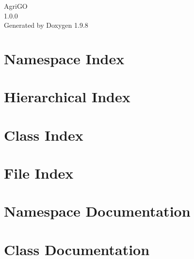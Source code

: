 \documentclass[twoside]{book}
\newcommand{\+}{\discretionary{\mbox{\scriptsize$\hookleftarrow$}}{}{}}
\newcommand{\clearemptydoublepage}{%
    \newpage{\pagestyle{empty}\cleardoublepage}%
  }
\begin{document}
  \raggedbottom
    \hypersetup{pageanchor=false,
                bookmarksnumbered=true,
                pdfencoding=unicode
               }
  \begin{titlepage}
  \vspace*{7cm}
  \begin{center}%
  {\Large Agri\+GO}\\
  [1ex]\large 1.\+0.\+0 \\
  \vspace*{1cm}
  {\large Generated by Doxygen 1.9.8}\\
  \end{center}
  \end{titlepage}
  \clearemptydoublepage
  \tableofcontents
  \clearemptydoublepage
  \hypersetup{pageanchor=true}



\chapter{Namespace Index}

\chapter{Hierarchical Index}

\chapter{Class Index}

\chapter{File Index}

\chapter{Namespace Documentation}


\chapter{Class Documentation}











\end{document}
